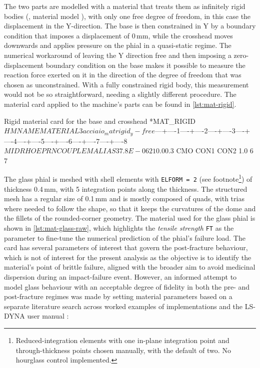 The two parts are modelled with a material that treats them as infinitely rigid bodies (, material model ), with only one free degree of freedom, in this case the displacement in the Y-direction. The base is then constrained in Y by a boundary condition that imposes a displacement of 0\,mm, while the crosshead moves downwards and applies pressure on the phial in a quasi-static regime. The numerical workaround of leaving the Y direction free and then imposing a zero-displacement boundary condition on the base makes it possible to measure the reaction force exerted on it in the direction of the degree of freedom that was chosen as unconstrained. With a fully constrained rigid body, this measurement would not be so straightforward, needing a slightly different procedure. The material card applied to the machine's parts can be found in \cref{lst:mat-rigid}.


\begin{dynacard}[label=lst:mat-rigid]{Rigid material card for the base and crosshead}
*MAT_RIGID
$HMNAME MATERIAL         3acciaio_matrigid_y-free
$---+----1----+----2----+----3----+----4----+----5----+----6----+----7----+----8
$      MID       RHO         E        PR         N    COUPLE         M     ALIAS
         3   7.8E-06     210.0       0.3
$      CMO      CON1      CON2
       1.0         6         7
\end{dynacard}


The glass phial is meshed with shell elements with \texttt{ELFORM = 2} (see footnote\footnote{Reduced-integration elements with one in-plane integration point and through-thickness points chosen manually, with the default of two. No hourglass control implemented.}) of thickness 0.4\,mm, with 5 integration points along the thickness. The structured mesh has a regular size of 0.1\,mm and is mostly composed of quads, with trias where needed to follow the shape, so that it keeps the curvatures of the dome and the fillets of the rounded-corner geometry. The material used for the glass phial is shown in \cref{lst:mat-glass-raw}, which highlights the \textit{tensile strength} \texttt{FT} as the parameter to fine-tune the numerical prediction of the phial's failure load. The card has several parameters of interest that govern the post-fracture behaviour, which is not of interest for the present analysis as the objective is to identify the material's point of brittle failure, aligned with the broader aim to avoid medicinal dispersion during an impact-failure event. However, an informed attempt to model glass behaviour with an acceptable degree of fidelity in both the pre- and post-fracture regimes was made by setting material parameters based on a separate literature search across worked examples of  implementations \cite{DCFEA2025} and the LS-DYNA user manual \cite[p.~1989-2001]{LSDYNA_KW_II}:

